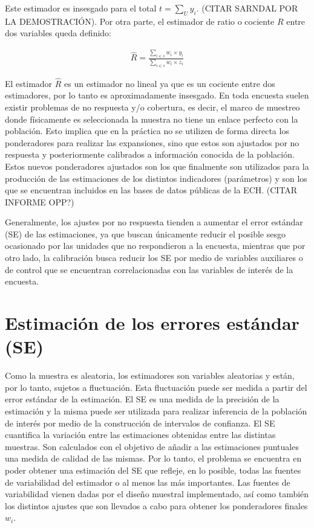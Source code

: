 \documentclass[12pt,twoside,spanish,a4paper]{book}\usepackage[]{graphicx}\usepackage[]{color}
\begin{document}
Este estimador es insesgado para el total $t=\sum_{U}^{}y_i$. \citep{sarndal2003model} (CITAR SARNDAL POR LA DEMOSTRACIÓN). Por otra parte, el estimador de ratio o cociente $R$ entre dos variables queda definido:

\begin{equation}\label{m7}
\begin{array}{cc}
\hat R=\frac{\sum\nolimits_{i\in s} w_i \times y_i}{\sum\nolimits_{i\in s} w_i\times z_i}
\end{array}
\end{equation}

El estimador $\hat R$ es un estimador no lineal ya que es un cociente entre dos estimadores, por lo tanto es aproximadamente insesgado. En toda encuesta suelen existir problemas de no respuesta y/o cobertura, es decir, el marco de muestreo donde físicamente es seleccionada la muestra no tiene un enlace perfecto con la población. Esto implica que en la práctica no se utilizen de forma directa los ponderadores para realizar las expansiones, sino que estos son ajustados por no respuesta y posteriormente calibrados a información conocida de la población. Estos nuevos ponderadores ajustados son los que finalmente son utilizados para la producción de las estimaciones de los distintos indicadores (parámetros) y son los que se encuentran incluidos en las bases de datos públicas de la ECH.  (CITAR INFORME OPP?)

Generalmente, los ajustes por no respuesta tienden a aumentar el error estándar (SE) de las estimaciones, ya que buscan únicamente reducir el posible sesgo ocasionado por las unidades que no respondieron a la encuesta, mientras que por otro lado, la calibración busca reducir los SE por medio de variables auxiliares o de control que se encuentran correlacionadas con las variables de interés de la encuesta. 


\section{Estimación de los errores estándar (SE) \label{sec:estse}}

Como la muestra es aleatoria, los estimadores son variables aleatorias y están, por lo tanto, sujetos a fluctuación. Esta fluctuación puede ser medida a partir del error estándar de la estimación. El SE es una medida de la precisión de la estimación y la misma puede ser utilizada para realizar inferencia de la población de interés por medio de la construcción de intervalos de confianza. El SE cuantifica la variación entre las estimaciones obtenidas entre las distintas muestras. Son calculados con el objetivo de añadir a las estimaciones puntuales una medida de calidad de las mismas. Por lo tanto, el problema se encuentra en poder obtener una estimación del SE que refleje, en lo posible, todas las fuentes de variabilidad del estimador o al menos las más importantes. Las fuentes de variabilidad vienen dadas por el diseño muestral implementado, así como también los distintos ajustes que son llevados a cabo para obtener los ponderadores finales $w_i$.
\end{document}
